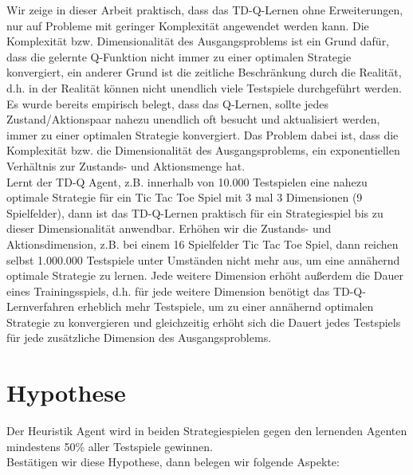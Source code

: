Wir zeige in dieser Arbeit praktisch, dass das TD-Q-Lernen ohne Erweiterungen, nur auf Probleme mit geringer Komplexität angewendet werden kann. Die Komplexität bzw. Dimensionalität des Ausgangsproblems ist ein Grund dafür, dass die gelernte Q-Funktion nicht immer zu einer optimalen Strategie konvergiert, ein anderer Grund ist die zeitliche Beschränkung durch die Realität, d.h. in der Realität können nicht unendlich viele Testspiele durchgeführt werden. Es wurde bereits empirisch belegt, dass das Q-Lernen, sollte jedes Zustand/Aktionspaar nahezu unendlich oft besucht und aktualisiert werden, immer zu einer optimalen Strategie konvergiert. Das Problem dabei ist, dass die Komplexität bzw. die Dimensionalität des Ausgangsproblems, ein exponentiellen Verhältnis zur Zustands- und Aktionsmenge hat. \\

Lernt der TD-Q Agent, z.B. innerhalb von 10.000 Testspielen eine nahezu optimale Strategie für ein Tic Tac Toe Spiel mit 3 mal 3 Dimensionen (9 Spielfelder), dann ist das TD-Q-Lernen praktisch für ein Strategiespiel bis zu dieser Dimensionalität anwendbar. Erhöhen wir die Zustands- und Aktionsdimension, z.B. bei einem 16 Spielfelder Tic Tac Toe Spiel, dann reichen selbst 1.000.000 Testspiele unter Umständen nicht mehr aus, um eine annähernd optimale Strategie zu lernen. Jede weitere Dimension erhöht außerdem die Dauer eines Trainingsspiels, d.h. für jede weitere Dimension benötigt das TD-Q-Lernverfahren erheblich mehr Testspiele, um zu einer annähernd optimalen Strategie zu konvergieren und gleichzeitig erhöht sich die Dauert jedes Testspiels für jede zusätzliche Dimension des Ausgangsproblems.

\section{Hypothese}
\label{sec:Hypothese}
Der Heuristik Agent wird in beiden Strategiespielen gegen den lernenden Agenten mindestens 50\% aller Testspiele gewinnen.\\

Bestätigen wir diese Hypothese, dann belegen wir folgende Aspekte:

